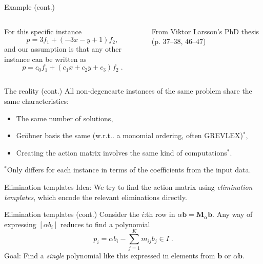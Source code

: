 \documentclass[aspectratio=169]{beamer}
\makeatletter
\newcommand{\mat}[1]{\bm{#1}}
\DeclareRobustCommand\wrt{w.r.t\@ifnextchar.{}{.\@}}
\makeatother
\begin{document}
\begin{frame}[t]{Example (cont.)}
\vspace{1cm}
\begin{columns}
    \begin{column}{0.7\textwidth}
        For this specific instance
        \begin{equation*}
            p = 3f_1 + (-3x-y+1)f_2,
        \end{equation*}
        and our assumption is that any other instance can be written as
        \begin{equation*}
            p = c_0f_1 + (c_1x+c_2y+c_3)f_2\;.
        \end{equation*}
    \end{column}%
    \begin{column}{0.3\textwidth}
        \centering
        

        \vspace{5mm}

        {\scriptsize From Viktor Larsson's PhD thesis (p. 37--38, 46--47)}
    \end{column}
\end{columns}
\end{frame}

\begin{frame}{The reality (cont.)}
All non-degenearte instances of the same problem share the same characteristics:
\begin{itemize}
\item The same number of solutions,
\item Gröbner basis the same (\wrt{} a monomial ordering, often GREVLEX)${}^*$,
\item Creating the action matrix involves the same kind of computations${}^*$.
\end{itemize}
${}^*$Only differs for each instance in terms of the coefficients from the input data.
\end{frame}

\begin{frame}{Elimination templates}
\alert{Idea:} We try to find the action matrix using \emph{elimination templates},
which encode the relevant eliminations directly.
\end{frame}

\begin{frame}{Elimination templates (cont.)}
Consider the $i$:th row in $\alpha\mat{b} = \mat{M}_\alpha\mat{b}$.
Any way of expressing $[\alpha b_i]$ reduces to find a polynomial
\begin{equation*}
    p_i = \alpha b_i -\sum_{j=1}^Km_{ij}b_{j}\in I\;.
\end{equation*}
\alert{Goal:} Find a \emph{single} polynomial like this expressed in elements from
$\mat{b}$ or $\alpha\mat{b}$.
\end{frame}
\end{document}
